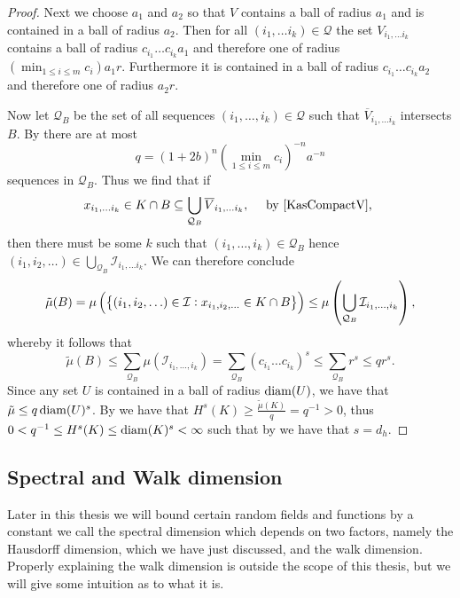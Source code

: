 \begin{proof}
	Next we choose $a_1$ and $a_2$ so that $V$ contains a ball of radius $a_1$ and is contained in a ball of radius $a_2$. Then for all $(i_1, \ldots i_k) \in \mathcal{Q}$ the set $V_{i_1, \ldots i_k}$ contains a ball of radius $c_{i_1} \dots c_{i_k} a_1$ and therefore one of radius $\left(\min_{1 \leq i \leq m} c_i\right) a_1 r$. Furthermore it is contained in a ball of radius $c_{i_1} \dots c_{i_k} a_2$ and therefore one of radius $a_2 r$.
	
	Now let $\mathcal{Q}_{B}$ be the set of all sequences $(i_1, \ldots, i_k) \in \mathcal{Q}$ such that $\overline{V}_{i_1, \ldots i_k}$ intersects $B$. By  there are at most
	$$q = (1+2b)^{n} \left(\min_{1\leq i \leq m} c_i\right)^{-n} a^{-n}$$
	sequences in $\mathcal{Q}_{B}$. Thus we find that if
	\begin{equation}
		x_{i_1, \ldots i_k} \in K \cap B \subseteq \bigcup_{\mathcal{Q}_{B}} \overline{V}_{i_1, \ldots i_k}, \quad \text{ by \eqref{KasCompactV}, }
	\end{equation}
	then there must be some $k$ such that $(i_1, \ldots, i_k) \in \mathcal{Q}_{B}$ hence $(i_1, i_2, \ldots) \in \bigcup_{\mathcal{Q}_{B}} \mathcal{I}_{i_1, \ldots i_k}$. We can therefore conclude
	\begin{equation}
		\tilde{\mu}(B) = \mu \left(\cbr{(i_1, i_2, \ldots) \in \mathcal{I} : x_{i_1, i_2, \ldots} \in K \cap B}\right) \leq \mu \left(\bigcup_{\mathcal{Q}_{B}} \mathcal{I}_{i_1, \ldots, i_k}\right),
	\end{equation}
	whereby it follows that
	\begin{equation}
		\tilde{\mu}(B) \leq \sum_{\mathcal{Q}_{B}} \mu\left(\mathcal{I}_{i_1, \ldots, i_k}\right) = \sum_{\mathcal{Q}_{B}} \left(c_{i_1} \dots c_{i_k}\right)^{s} \leq \sum_{\mathcal{Q}_{B}} r^{s} \leq qr^{s}.
	\end{equation}
	Since any set $U$ is contained in a ball of radius $\operatorname{diam}(U)$, we have that $\tilde{\mu} \leq q \operatorname{diam}(U)^{s}$. By  we have that $H^{s}(K) \geq \frac{\tilde{\mu}(K)}{q} = q^{-1} > 0$, thus $0 < q^{-1} \leq H^{s}(K) \leq \operatorname{diam}(K)^{s} < \infty$ such that by  we have that $s = d_h$.
\end{proof}

\clearpage
\subsection{Spectral and Walk dimension}
Later in this thesis we will bound certain random fields and functions by a constant we call the spectral dimension which depends on two factors, namely the Hausdorff dimension, which we have just discussed, and the walk dimension. Properly explaining the walk dimension is outside the scope of this thesis, but we will give some intuition as to what it is.


